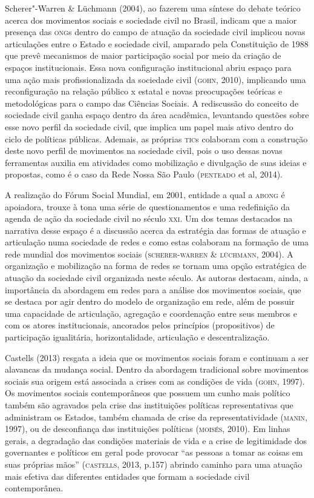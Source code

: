 Scherer"-Warren \& Lüchmann (2004), ao fazerem uma síntese do debate
teórico acerca dos movimentos sociais e sociedade civil no Brasil,
indicam que a maior presença das \textsc{ong}s dentro do campo de atuação da
sociedade civil implicou novas articulações entre o Estado e sociedade
civil, amparado pela Constituição de 1988 que prevê mecanismos de maior
participação social por meio da criação de espaços institucionais. Essa
nova configuração institucional abriu espaço para uma ação mais
profissionalizada da sociedade civil (\textsc{gohn}, 2010), implicando uma
reconfiguração na relação público x estatal e novas preocupações
teóricas e metodológicas para o campo das Ciências Sociais. A
rediscussão do conceito de sociedade civil ganha espaço dentro da área
acadêmica, levantando questões sobre esse novo perfil da sociedade
civil, que implica um papel mais ativo dentro do ciclo de políticas
públicas. Ademais, as próprias \textsc{tic}s colaboram com a construção deste
novo perfil de movimentos na sociedade civil, pois o uso dessas novas
ferramentas auxilia em atividades como mobilização e divulgação de suas
ideias e propostas, como é o caso da Rede Nossa São Paulo (\textsc{penteado} et
al, 2014).

A realização do Fórum Social Mundial, em 2001, entidade a qual a \textsc{abong} é
apoiadora, trouxe à tona uma série de questionamentos e uma redefinição
da agenda de ação da sociedade civil no século \textsc{xxi}. Um dos temas
destacados na narrativa desse espaço é a discussão acerca da estratégia
das formas de atuação e articulação numa sociedade de redes e como estas
colaboram na formação de uma rede mundial dos movimentos sociais
(\textsc{scherer}-\textsc{warren} \& \textsc{lüchmann}, 2004). A organização e mobilização na forma
de redes se tornam uma opção estratégica de atuação da sociedade civil
organizada neste século. As autoras destacam, ainda, a importância da
abordagem em redes para a análise dos movimentos sociais, que se destaca
por agir dentro do modelo de organização em rede, além de possuir uma
capacidade de articulação, agregação e coordenação entre seus membros e
com os atores institucionais, ancorados pelos princípios (propositivos)
de participação igualitária, horizontalidade, articulação e
descentralização.

Castells (2013) resgata a ideia que os movimentos sociais foram e
continuam a ser alavancas da mudança social. Dentro da abordagem
tradicional sobre movimentos sociais sua origem está associada a crises
com as condições de vida (\textsc{gohn}, 1997). Os movimentos sociais
contemporâneos que possuem um cunho mais político também são agravados
pela crise das instituições políticas representativas que administram os
Estados, também chamada de crise da representatividade (\textsc{manin}, 1997), ou
de desconfiança das instituições políticas (\textsc{moisés}, 2010). Em linhas
gerais, a degradação das condições materiais de vida e a crise de
legitimidade dos governantes e políticos em geral pode provocar ``as
pessoas a tomar as coisas em suas próprias mãos'' (\textsc{castells}, 2013, p.157)
abrindo caminho para uma atuação mais efetiva das diferentes entidades
que formam a sociedade civil contemporânea.

